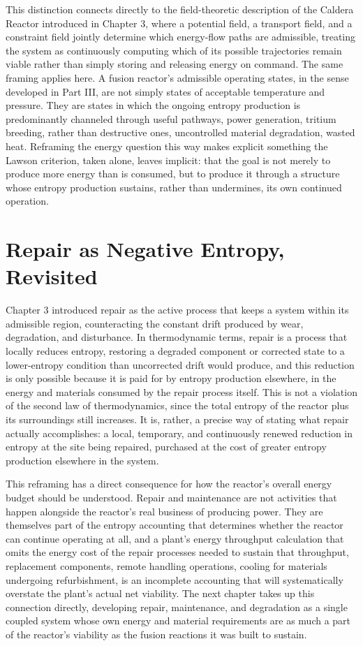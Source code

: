 This distinction connects directly to the field-theoretic description of the Caldera Reactor introduced in Chapter 3, where a potential field, a transport field, and a constraint field jointly determine which energy-flow paths are admissible, treating the system as continuously computing which of its possible trajectories remain viable rather than simply storing and releasing energy on command. The same framing applies here. A fusion reactor's admissible operating states, in the sense developed in Part III, are not simply states of acceptable temperature and pressure. They are states in which the ongoing entropy production is predominantly channeled through useful pathways, power generation, tritium breeding, rather than destructive ones, uncontrolled material degradation, wasted heat. Reframing the energy question this way makes explicit something the Lawson criterion, taken alone, leaves implicit: that the goal is not merely to produce more energy than is consumed, but to produce it through a structure whose entropy production sustains, rather than undermines, its own continued operation.

\section{Repair as Negative Entropy, Revisited}

Chapter 3 introduced repair as the active process that keeps a system within its admissible region, counteracting the constant drift produced by wear, degradation, and disturbance. In thermodynamic terms, repair is a process that locally reduces entropy, restoring a degraded component or corrected state to a lower-entropy condition than uncorrected drift would produce, and this reduction is only possible because it is paid for by entropy production elsewhere, in the energy and materials consumed by the repair process itself. This is not a violation of the second law of thermodynamics, since the total entropy of the reactor plus its surroundings still increases. It is, rather, a precise way of stating what repair actually accomplishes: a local, temporary, and continuously renewed reduction in entropy at the site being repaired, purchased at the cost of greater entropy production elsewhere in the system.

This reframing has a direct consequence for how the reactor's overall energy budget should be understood. Repair and maintenance are not activities that happen alongside the reactor's real business of producing power. They are themselves part of the entropy accounting that determines whether the reactor can continue operating at all, and a plant's energy throughput calculation that omits the energy cost of the repair processes needed to sustain that throughput, replacement components, remote handling operations, cooling for materials undergoing refurbishment, is an incomplete accounting that will systematically overstate the plant's actual net viability. The next chapter takes up this connection directly, developing repair, maintenance, and degradation as a single coupled system whose own energy and material requirements are as much a part of the reactor's viability as the fusion reactions it was built to sustain.
